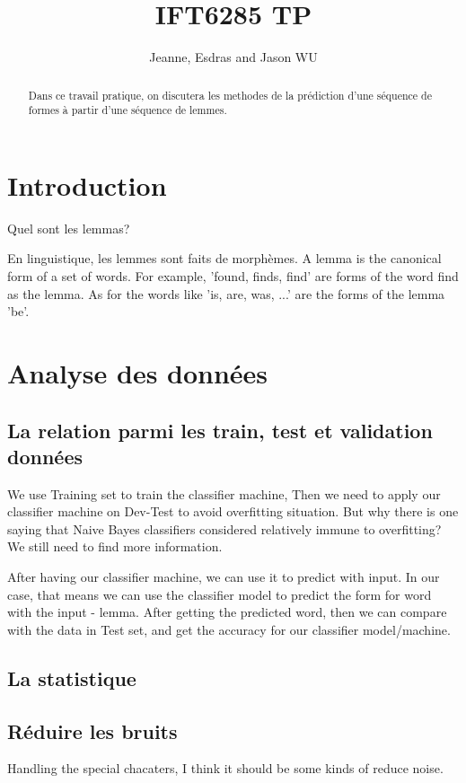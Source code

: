 \documentclass[a4paper]{article}
\title{IFT6285 TP}
\author{Jeanne, Esdras and Jason WU}
\begin{document}
\maketitle

\begin{abstract}
Dans ce travail pratique,  on discutera les methodes de la prédiction d'une séquence de formes à partir d'une séquence de lemmes.
\end{abstract}

\section{Introduction}
Quel sont les lemmas?

En linguistique, les lemmes sont faits de morphèmes. A lemma is the canonical form of a set of words. For example, 'found, finds, find' are forms of the word find as the lemma. As for the words like 'is, are, was, ...' are the forms of the lemma 'be'.

\section{Analyse des données}

\subsection{La relation parmi les train, test et validation données}

We use Training set to train the classifier machine, Then we need to apply our classifier machine on Dev-Test to avoid overfitting situation. But why there is one saying that Naive Bayes classifiers considered relatively immune to overfitting? We still need to find more information.

After having our classifier machine, we can use it to predict with input. In our case, that means we can use the classifier model to predict the form for word with the input - lemma. After getting the predicted word, then we can compare with the data in Test set, and get the accuracy for our classifier model/machine.

\subsection{La statistique}

\subsection{Réduire les bruits}
Handling the special chacaters, I think it should be some kinds of reduce noise.
\end{document}
